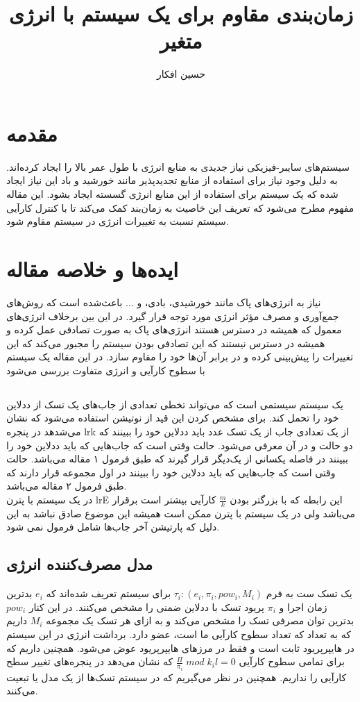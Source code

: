 \documentclass[a4paper, 11pt]{article}
\title{زمان‌بندی مقاوم برای یک سیستم
\lr{Weakly-Hard Real-Time}
با انرژی متغیر
}
\author{حسین افکار}
\begin{document}
\maketitle

\section{مقدمه}
سیستم‌های سایبر-فیزیکی نیاز جدیدی به منابع انرژی با طول عمر بالا را ایجاد کرده‌اند.
به دلیل وجود نیاز برای استفاده از منابع تجدید‌پذیر مانند خورشید و باد این نیاز ایجاد شده که یک
سیستم برای استفاده از این منابع انرژی گسسته ایجاد بشود.
این مقاله مفهوم
مطرح می‌شود که تعریف این خاصیت به زمان‌بند کمک می‌کند تا با کنترل کارآیی سیستم نسبت به
تغییرات انرژی در سیستم مقاوم شود.

\section{ایده‌ها و خلاصه مقاله}
نیاز به انرژی‌های پاک مانند خورشیدی، بادی، و ... باعث‌‌شده است که روش‌های جمع‌آوری و مصرف
مؤثر انرژی مورد توجه قرار گیرد.
در این بین برخلاف انرژی‌های معمول که همیشه در دسترس هستند انرژی‌های پاک به صورت تصادفی
عمل کرده و همیشه در دسترس نیستند که این تصادفی بودن سیستم را مجبور می‌کند که این تغییرات
را پیش‌بینی کرده و در برابر آن‌ها خود را مقاوم سازد.
در این مقاله یک سیستم
با سطوح کارآیی و انرژی متفاوت بررسی می‌شود
\subsection{}
یک سیستم
سیستمی است که می‌تواند تخطی تعدادی از جاب‌های یک تسک از ددلاین خود را تحمل کند.
برای مشخص کردن این قید از نوتیشن
استفاده می‌شود که نشان می‌شدهد در پنجره
lr{k}
از یک تعدادی جاب از یک تسک
عدد باید ددلاین خود را ببینند که دو
حالت
و
در آن معرفی می‌شود.
حالت
وقتی است که جاب‌هایی که باید ددلاین خود را ببینند در فاصله یکسانی از یک‌دیگر قرار گیرند که
طبق فرمول ۱ مقاله می‌باشد.
حالت
وقتی است که جاب‌هایی که باید ددلاین خود را ببینند در اول مجموعه قرار دارند که طبق فرمول ۲
مقاله می‌باشد. \\
در یک سیستم با پترن
lr{E}
این رابطه که با بزرگتر بودن
$\frac{m}{k}$
کارآیی بیشتر است برقرار می‌باشد ولی در یک سیستم با پترن
ممکن است همیشه این موضوع صادق نباشد به این دلیل که پارتیشن آخر جاب‌ها شامل فرمول نمی شود.

\subsection{مدل مصرف‌کننده انرژی}
یک تسک ست به فرم
$\tau_i: (e_i,\pi_i,pow_i,M_i)$
برای سیستم تعریف شده‌اند که 
$e_i$
بدترین زمان اجرا و
$\pi_i$
پریود تسک با ددلاین ضمنی را مشخص می‌کنند. در این کنار
$pow_i$
بدترین توان مصرفی تسک را مشخص می‌کند و به ازای هر تسک یک مجموعه
$M_i$
داریم که به تعداد
که تعداد سطوح کارآیی ما است، عضو دارد.
برداشت انرژی در این سیستم در هایپرپریود ثابت است و فقط در مرز‌های هایپرپریود عوض می‌شود.
همچنین داریم که برای تمامی سطوح کارآیی
$\frac{\Pi}{\pi_i}\;mod\;k_il = 0$
که نشان می‌دهد در پنجره‌های
تغییر سطح کارآیی را نداریم.
همچنین در نظر می‌گیریم که در سیستم تسک‌ها از یک مدل
یا
تبعیت می‌کنند.
\end{document}
